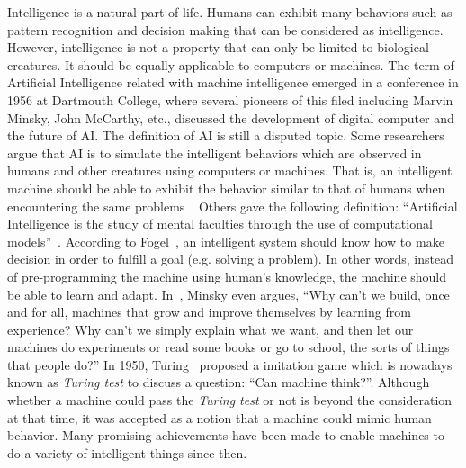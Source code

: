 Intelligence is a natural part of life. Humans can exhibit many behaviors such as pattern recognition and decision making that can be considered as intelligence. However, intelligence is not a property that can only be limited to biological creatures. It should be equally applicable to computers or machines. The term of Artificial Intelligence related with machine intelligence emerged in a conference in 1956 at Dartmouth College, where several pioneers of this filed including Marvin Minsky, John McCarthy, etc., discussed the development of digital computer and the future of AI. The definition of AI is still a disputed topic.  Some researchers argue that AI is to simulate the intelligent behaviors which are observed in humans and other creatures using computers or machines. That is, an intelligent machine should be able to exhibit the behavior similar to that of humans when encountering the same problems~\cite{Schildt1985}. Others gave the following definition: ``Artificial Intelligence is the study of mental faculties through the use of computational models''~\cite{Charniak1985}. According to Fogel~\cite{Fogel1995}, an intelligent system should know how to make decision in order to fulfill a goal (e.g. solving a problem). In other words, instead of pre-programming the machine using human's knowledge, the machine should be able to learn and adapt. In~\cite{Minsky_1991}, Minsky even argues, ``Why can't we build, once and for all, machines that grow and improve themselves by learning from experience? Why can't we simply explain what we want, and then let our machines do experiments or read some books or go to school, the sorts of things that people do?'' In 1950, Turing~\cite{Turing_1950} proposed a imitation game which is nowadays known as \textit{Turing test} to discuss a question: ``Can machine think?''. Although whether a machine could pass the \textit{Turing test} or not is beyond the consideration at that time, it was accepted as a notion that a machine could mimic human behavior. Many promising achievements have been made to enable machines to do a variety of intelligent things since then. 

